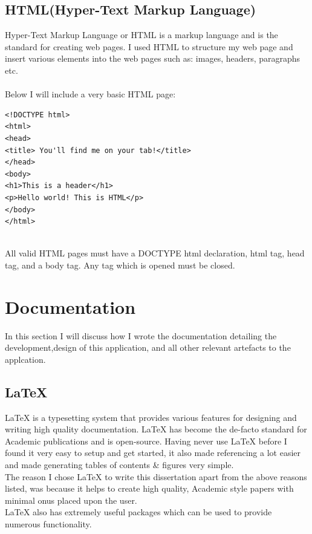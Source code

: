 \subsection{HTML(Hyper-Text Markup Language)}
Hyper-Text Markup Language or HTML is a markup language and is the standard for creating web pages\cite{HTML}.  I used HTML to structure my web page and insert various elements into the web pages such as: images, headers, paragraphs etc.
\\
\\
Below I will include a very basic HTML page:
\begin{verbatim}
<!DOCTYPE html>
<html>
<head>
<title> You'll find me on your tab!</title>
</head>
<body>
<h1>This is a header</h1>
<p>Hello world! This is HTML</p>
</body>
</html>
\end{verbatim}
\\
All valid HTML pages must have a DOCTYPE html declaration, html tag, head tag, and a body tag.  Any tag which is opened must be closed.
\section{Documentation}
In this section I will discuss how I wrote the documentation detailing the development,design of this application, and all other relevant artefacts to the applcation.
\subsection{\LaTeX}
\LaTeX \hspace{0.1cm} is a typesetting system that provides various features for designing and writing high quality documentation\cite{Latex}.  \LaTeX\hspace{0.1cm} has become the de-facto standard for Academic publications and is open-source. Having never use \LaTeX\hspace{0.1cm} before I found it very easy to setup and get started, it also made referencing a lot easier and made generating tables of contents \& figures very simple.
\\
The reason I chose \LaTeX \hspace{0.1cm} to write this dissertation apart from the above reasons listed, was because it helps to create high quality, Academic style papers with minimal onus placed upon the user.
\\
\LaTeX \hspace{0.1cm} also has extremely useful packages which can be used to provide numerous functionality.
